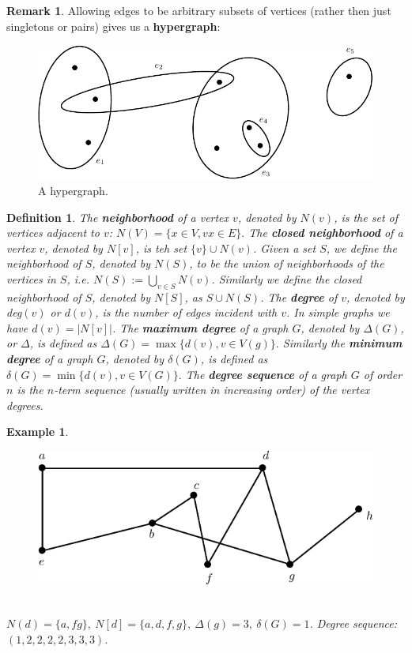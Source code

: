 \documentclass[12pt,a4paper]{article}
\newtheorem{defn}{Definition}[section]
\newtheorem{exmp}{Example}[section]
\theoremstyle{definition}
\newtheorem{rem}{Remark}[section]
\begin{document}
\begin{rem}Allowing edges to be arbitrary subsets of vertices (rather then just singletons or pairs) gives us a \textbf{hypergraph}:
\begin{figure}[hbtp]
\centering
\includegraphics[scale=.8]{images/graph4.pdf}
\caption{A hypergraph.}
\end{figure}

\end{rem}
\begin{defn} The \textbf{neighborhood} of a vertex $v$, denoted by $N(v)$, is the set of vertices adjacent to $v$: $N(V)= \{ x \in V, vx \in E\}.$ The \textbf{closed neighborhood} of a vertex $v$, denoted by $N[v]$, is teh set $\{v\} \cup N(v)$. Given a set $S$, we define the neighborhood of $S$, denoted by $N(S)$, to be the union of neighborhoods of the vertices in $S$, i.e. $N(S):= \bigcup_{v \in S} N(v)$. Similarly we define the closed neighborhood of $S$, denoted by $N[S]$, as $S \cup N(S)$. The \textbf{degree} of $v$, denoted by deg$(v)$ or $d(v)$, is the number of edges incident with $v$. In simple graphs we have $d(v)= |N[v]|$. The \textbf{maximum degree} of a graph $G$, denoted by $\Delta(G)$, or $\Delta$, is defined as $\Delta(G)= \max \{ d(v), v \in V(g)\}.$ Similarly the \textbf{minimum degree} of a graph $G$, denoted by $\delta(G)$, is defined as $\delta(G)= \min \{ d(v), v \in V(G) \}.$ The \textbf{degree sequence} of a graph $G$ of order $n$ is the $n$-term sequence (usually written in increasing order) of the vertex degrees. 
\end{defn}
\newpage
\begin{exmp} \
\begin{figure}[hbtp]
\centering
\includegraphics[scale=1]{images/graph5.pdf}
\end{figure}
\\
$N(d)= \{a,fg\}, \ N[d] = \{a,d,f,g\}, \ \Delta(g)=3, \ \delta(G)=1$. Degree sequence: $(1,2,2,2,2,3,3,3)$.
\end{exmp}
\end{document}
